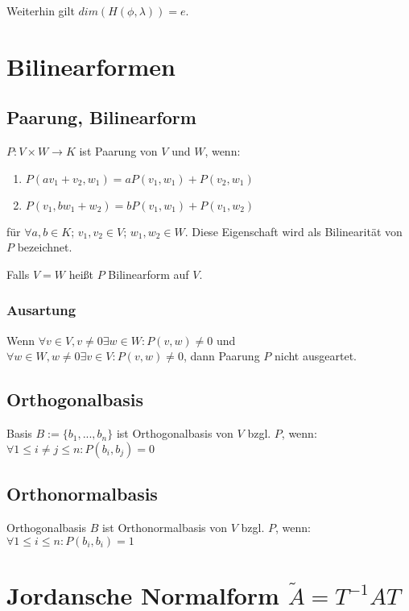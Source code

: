 Weiterhin gilt $dim(H(\phi, \lambda))=e$.

\section*{Bilinearformen}

\subsection*{Paarung, Bilinearform}

$P : V \times W \rightarrow K$ ist Paarung von $V$ und $W$, wenn:

\begin{enumerate}[label=(\alph*)]
	\item $P(av_1 + v_2, w_1) = aP(v_1, w_1) + P(v_2, w_1)$
	\item $P(v_1, bw_1 + w_2) = bP(v_1, w_1) + P(v_1, w_2)$
\end{enumerate}

für $\forall a, b \in K$; $v_1, v_2 \in V$; $w_1, w_2 \in W$. Diese Eigenschaft wird als Bilinearität von $P$ bezeichnet.

Falls $V=W$ heißt $P$ Bilinearform auf $V$.

\subsubsection*{Ausartung}

Wenn $\forall v \in V, v \neq 0 \exists w \in W : P(v, w) \neq 0$ und $\forall w \in W, w \neq 0 \exists v \in V : P(v, w) \neq 0$, dann Paarung $P$ nicht ausgeartet.

\subsection*{Orthogonalbasis}

Basis $B := \{b_1, ..., b_n\}$ ist Orthogonalbasis von $V$ bzgl. $P$, wenn: $\forall 1 \leq i \neq j \leq n : P(b_i, b_j) = 0$

\subsection*{Orthonormalbasis}

Orthogonalbasis $B$ ist Orthonormalbasis von $V$ bzgl. $P$, wenn: $\forall 1 \leq i \leq n : P(b_i, b_i) = 1$

\section*{Jordansche Normalform $\tilde A = T^{-1} A T$}

